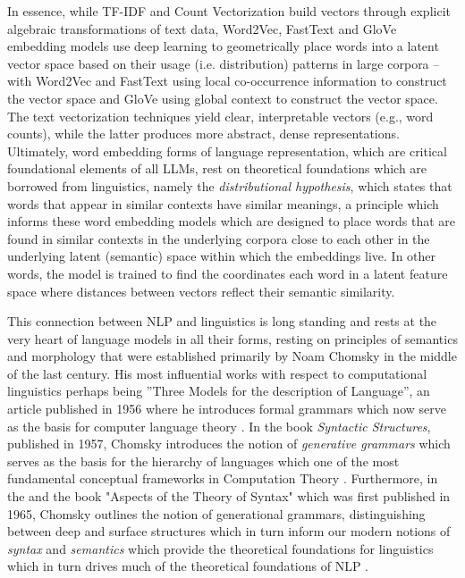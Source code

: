 \documentclass[final]{clv2025-revised}
\begin{document}
In essence, while TF-IDF and Count Vectorization build vectors through explicit algebraic transformations of text data, Word2Vec, FastText and GloVe embedding models use deep learning to geometrically place words into a latent vector space based on their usage (i.e. distribution) patterns in large corpora – with Word2Vec and FastText using local co-occurrence information to construct the vector space and GloVe using global context to construct the vector space. The text vectorization techniques yield clear, interpretable vectors (e.g., word counts), while the latter produces more abstract, dense representations. Ultimately, word embedding forms of language representation, which are critical foundational elements of all LLMs, rest on theoretical foundations which are borrowed from linguistics, namely the \textit{distributional hypothesis}, which states that words that appear in similar contexts have similar meanings, a principle which informs these word embedding models which are designed to place words that are found in similar contexts in the underlying corpora close to each other in the underlying latent (semantic) space within which the embeddings live. In other words, the model is trained to find the coordinates each word in a latent feature space where distances between vectors reflect their semantic similarity.

This connection between NLP and linguistics is long standing and rests at the very heart of language models in all their forms, resting on principles of semantics and morphology that were established primarily by Noam Chomsky in the middle of the last century. His most influential works with respect to computational linguistics perhaps being ''Three Models for the description of Language'', an article published in 1956 where he introduces formal grammars which now serve as the basis for computer language theory \cite{chomsky56}. In the book \textit{Syntactic Structures}, published in 1957, Chomsky introduces the notion of \textit{generative grammars} which serves as the basis for the hierarchy of languages which one of the most fundamental conceptual frameworks in Computation Theory \cite{Chomsky57}. Furthermore, in the and the book "Aspects of the Theory of Syntax" which was first published in 1965, Chomsky outlines the notion of generational grammars, distinguishing between deep and surface structures which in turn inform our modern notions of \textit{syntax} and \textit{semantics} which provide the theoretical foundations for linguistics which in turn drives much of the theoretical foundations of NLP \cite{chomsky65aspects}.
\end{document}

